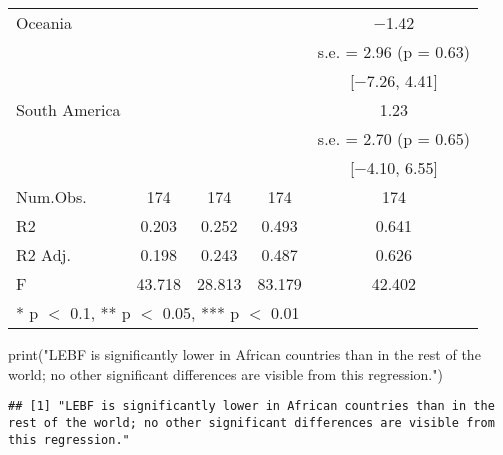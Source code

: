 \documentclass[
]{article}
\newenvironment{Shaded}{\begin{snugshade}}{\end{snugshade}}
\newcommand{\FunctionTok}[1]{\textcolor[rgb]{0.00,0.00,0.00}{#1}}
\newcommand{\NormalTok}[1]{#1}
\newcommand{\StringTok}[1]{\textcolor[rgb]{0.31,0.60,0.02}{#1}}
\begin{document}
\begin{table}
\begin{tabular}[t]{lcccc}
Oceania &  &  &  & \num{-1.42}\\
 &  &  &  & s.e. = \num{2.96} (p = \num{0.63})\\
 &  &  &  & {}[\num{-7.26}, \num{4.41}]\\
South America &  &  &  & \num{1.23}\\
 &  &  &  & s.e. = \num{2.70} (p = \num{0.65})\\
 &  &  &  & {}[\num{-4.10}, \num{6.55}]\\
\midrule
Num.Obs. & \num{174} & \num{174} & \num{174} & \num{174}\\
R2 & \num{0.203} & \num{0.252} & \num{0.493} & \num{0.641}\\
R2 Adj. & \num{0.198} & \num{0.243} & \num{0.487} & \num{0.626}\\
F & \num{43.718} & \num{28.813} & \num{83.179} & \num{42.402}\\
\bottomrule
\multicolumn{5}{l}{\rule{0pt}{1em}* p $<$ 0.1, ** p $<$ 0.05, *** p $<$ 0.01}\\
\end{tabular}
\end{table}

\begin{Shaded}
\begin{Highlighting}[]
\FunctionTok{print}\NormalTok{(}\StringTok{"LEBF is significantly lower in African countries than in the rest of the world; no other significant differences are visible from this regression."}\NormalTok{)}
\end{Highlighting}
\end{Shaded}

\begin{verbatim}
## [1] "LEBF is significantly lower in African countries than in the rest of the world; no other significant differences are visible from this regression."
\end{verbatim}
\end{document}
